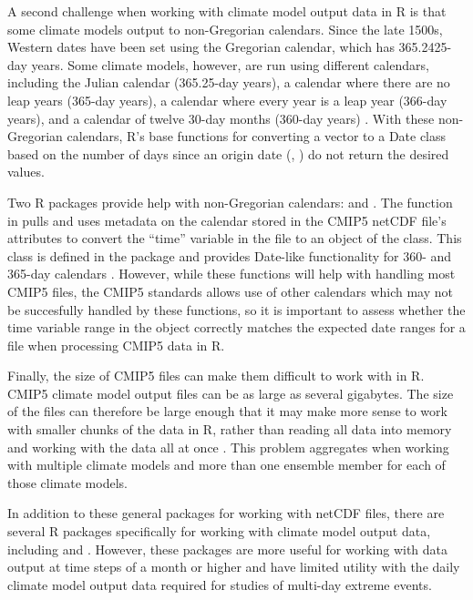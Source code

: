 A second challenge when working with climate model output data in R is
that some climate models output to non-Gregorian calendars. Since the
late 1500s, Western dates have been set using the Gregorian calendar,
which has 365.2425-day years. Some climate models, however, are run
using different calendars, including the Julian calendar (365.25-day
years), a calendar where there are no leap years (365-day years), a
calendar where every year is a leap year (366-day years), and a calendar
of twelve 30-day months (360-day years) \citep{cfconventions}. With
these non-Gregorian calendars, R's base functions for converting a
vector to a Date class based on the number of days since an origin date
(, ) do not return the desired values.

Two R packages provide help with non-Gregorian calendars: 
\citep{PCICt} and  \citep{ncdf4.helpers}. The
 function in  pulls and uses
metadata on the calendar stored in the CMIP5 netCDF file's attributes to
convert the ``time'' variable in the file to an object of the
 class. This class is defined in the  package and
provides Date-like functionality for 360- and 365-day calendars
\citep{PCICt}. However, while these functions will help with handling
most CMIP5 files, the CMIP5 standards allows use of other calendars
which may not be succesfully handled by these functions, so it is
important to assess whether the time variable range in the 
object correctly matches the expected date ranges for a file when
processing CMIP5 data in R.

Finally, the size of CMIP5 files can make them difficult to work with in
R. CMIP5 climate model output files can be as large as several
gigabytes. The size of the files can therefore be large enough that it
may make more sense to work with smaller chunks of the data in R, rather
than reading all data into memory and working with the data all at once
\citep{RCMIP5}. This problem aggregates when working with multiple
climate models and more than one ensemble member for each of those
climate models.

In addition to these general packages for working with netCDF files,
there are several R packages specifically for working with climate model
output data, including  \citep{RCMIP5} and 
\citep{wux}. However, these packages are more useful for working with
data output at time steps of a month or higher and have limited utility
with the daily climate model output data required for studies of
multi-day extreme events.

